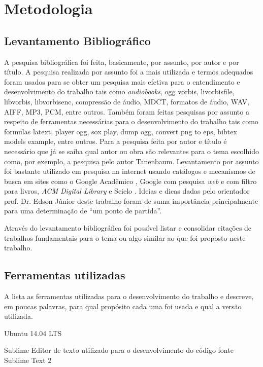 \chapter[Metodologia]{Metodologia}\label{cap5}

\section{Levantamento Bibliográfico}

A pesquisa bibliográfica foi feita, basicamente, por assunto, por autor e por título. A pesquisa realizada por assunto foi a mais utilizada e termos adequados foram usados para se obter um pesquisa mais efetiva para o entendimento e desenvolvimento do trabalho tais como \textit{audiobooks}, ogg vorbis, livorbisfile, libvorbis, libvorbisenc, compressão de áudio, MDCT, formatos de áudio, WAV, AIFF, MP3, PCM, entre outros. Também foram feitas pesquisas por assunto a respeito de ferramentas necessárias para o desenvolvimento do trabalho tais como formulas latext, player ogg, sox play, dump ogg, convert png to eps, bibtex models example, entre outros. Para a pesquisa feita por autor e título é necessário que já se saiba qual autor ou obra são relevantes para o tema escolhido como, por exemplo, a pesquisa pelo autor Tanenbaum. Levantamento por assunto foi bastante utilizado em pesquisa na internet usando catálogos e mecanismos de busca em sites como o Google Acadêmico \cite{googleacademico}, Google com pesquisa \textit{web} e com filtro para livros, \textit{ACM Digital Library} \cite{acm} e Scielo \cite{scielo}. Ideias e dicas dadas pelo orientador prof. Dr. Edson Júnior deste trabalho foram de suma importância principalmente para uma determinação de ``um ponto de partida''.

Através do levantamento bibliográfica foi possível listar e consolidar citações de trabalhos fundamentais para o tema ou algo similar ao que foi proposto neste trabalho. 

\section{Ferramentas utilizadas}

A lista as ferramentas utilizadas para o desenvolvimento do trabalho e descreve, em poucas palavras, para qual propósito cada uma foi usada e qual a versão utilizada.

Ubuntu 14.04 LTS

Sublime Editor de texto utilizado para o desenvolvimento do código fonte Sublime Text 2

